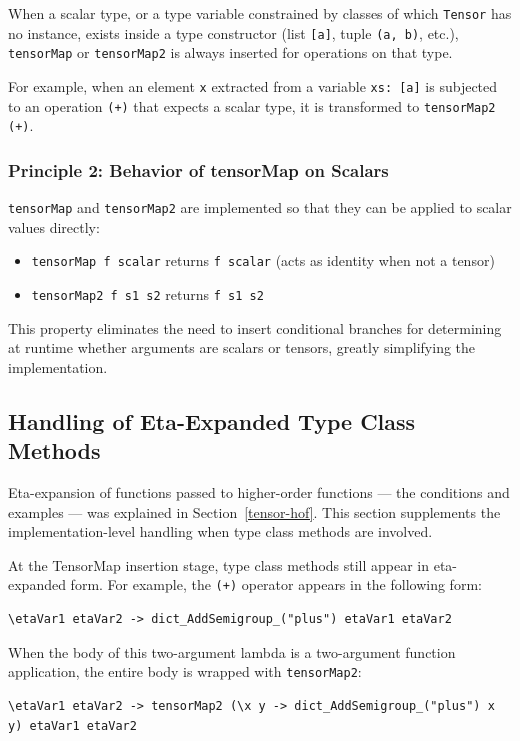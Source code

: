 When a scalar type, or a type variable constrained by classes of which \lstinline{Tensor} has no instance, exists inside a type constructor (list \lstinline{[a]}, tuple \lstinline{(a, b)}, etc.), \lstinline{tensorMap} or \lstinline{tensorMap2} is always inserted for operations on that type.

For example, when an element \lstinline{x} extracted from a variable \lstinline{xs: [a]} is subjected to an operation \lstinline{(+)} that expects a scalar type, it is transformed to \lstinline{tensorMap2 (+)}.

\subsubsection{Principle 2: Behavior of tensorMap on Scalars}

\lstinline{tensorMap} and \lstinline{tensorMap2} are implemented so that they can be applied to scalar values directly:

\begin{itemize}
\item \lstinline{tensorMap f scalar} returns \lstinline{f scalar} (acts as identity when not a tensor)
\item \lstinline{tensorMap2 f s1 s2} returns \lstinline{f s1 s2}
\end{itemize}

This property eliminates the need to insert conditional branches for determining at runtime whether arguments are scalars or tensors, greatly simplifying the implementation.

\subsection{Handling of Eta-Expanded Type Class Methods}

Eta-expansion of functions passed to higher-order functions --- the conditions and examples --- was explained in Section~\ref{tensor-hof}.
This section supplements the implementation-level handling when type class methods are involved.

At the TensorMap insertion stage, type class methods still appear in eta-expanded form.
For example, the \lstinline{(+)} operator appears in the following form:
\begin{lstlisting}[language=egison,numbers=none]
\etaVar1 etaVar2 -> dict_AddSemigroup_("plus") etaVar1 etaVar2
\end{lstlisting}

When the body of this two-argument lambda is a two-argument function application, the entire body is wrapped with \lstinline{tensorMap2}:
\begin{lstlisting}[language=egison,numbers=none]
\etaVar1 etaVar2 -> tensorMap2 (\x y -> dict_AddSemigroup_("plus") x y) etaVar1 etaVar2
\end{lstlisting}

